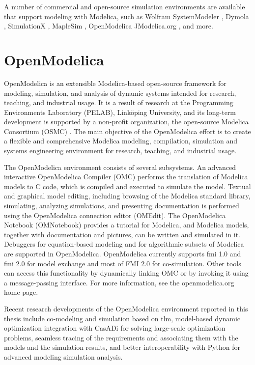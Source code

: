 A number of commercial and open-source simulation environments are available that support modeling with Modelica, such as Wolfram SystemModeler \cite{wolfram, wolframmats, wolframpeter}, Dymola \cite{dymola, dymoladag}, SimulationX \cite{simulationx}, MapleSim \cite{maplesim}, OpenModelica \cite{openmodelica,openmodelicapeter} JModelica.org \cite{jmodelica}, and more. 


\section{OpenModelica}
\label{sec:openmodelica}

OpenModelica \cite{openmodelica,openmodelicapeter} is an extensible Modelica-based open-source framework for modeling, simulation, and analysis of dynamic systems intended for research, teaching, and industrial usage. It is a result of research at the Programming Environments Laboratory (PELAB), Link\"{o}ping University, and its long-term development is supported by a non-profit organization, the open-source Modelica Consortium (OSMC) \cite{osmc}. The main objective of the OpenModelica effort is to create a flexible and comprehensive Modelica modeling, compilation, simulation and systems engineering environment for research, teaching, and industrial usage.

The OpenModelica environment consists of several subsystems. An advanced interactive OpenModelica Compiler (OMC) performs the translation of Modelica models to C code, which is compiled and executed to simulate the model. Textual and graphical model editing, including browsing of the Modelica standard library, simulating, analyzing simulations, and presenting documentation is performed using the OpenModelica connection editor (OMEdit). The OpenModelica Notebook (OMNotebook) provides a tutorial for Modelica, and Modelica models, together with documentation and pictures, can be written and simulated in it. Debuggers for equation-based modeling and for algorithmic subsets of Modelica are supported in OpenModelica. OpenModelica currently supports \acrshort{fmi} 1.0 and \acrshort{fmi} 2.0 for model exchange and most of FMI 2.0 for co-simulation. Other tools can access this functionality by dynamically linking OMC or by invoking it using a message-passing interface. For more information, see the openmodelica.org\cite{openmodelica} home page.

Recent research developments of the OpenModelica environment reported in this thesis include co-modeling and simulation based on \acrshort{tlm}, model-based dynamic optimization integration with CasADi \cite{casadi} for solving large-scale optimization problems, seamless tracing of the requirements and associating them with the models and the simulation results, and better interoperability with Python for advanced modeling simulation analysis.


